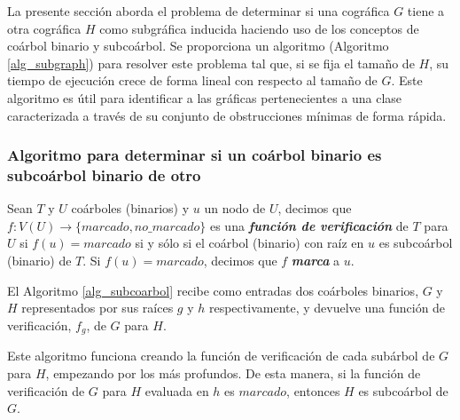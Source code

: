 La presente sección aborda el problema de determinar si una cográfica $G$ tiene a otra cográfica $H$ como subgráfica inducida haciendo uso de los conceptos de coárbol binario y subcoárbol. Se proporciona un algoritmo (Algoritmo \ref{alg_subgraph}) para resolver este problema tal que, si se fija el tamaño de $H$, su tiempo de ejecución crece de forma lineal con respecto al tamaño de $G$. Este algoritmo es útil para identificar a las gráficas pertenecientes a una clase caracterizada a través de su conjunto de obstrucciones mínimas de forma rápida. 

\subsubsection{Algoritmo para determinar si un coárbol binario es subcoárbol binario de otro}

\begin{definition}
    Sean $T$ y $U$ coárboles (binarios) y $u$ un nodo de $U$, decimos que $f:V(U)\rightarrow\{marcado, no\_marcado\}$ es una \textbf{\emph{función de verificación}} de $T$ para $U$ si $f(u) = marcado$ si y sólo si el coárbol (binario) con raíz en $u$ es subcoárbol (binario) de $T$. Si $f(u) = marcado$, decimos que $f$ \textbf{\emph{marca}} a $u$.
\end{definition}

El Algoritmo \ref{alg_subcoarbol} recibe como entradas dos coárboles binarios, $G$ y $H$ representados por sus raíces $g$ y $h$ respectivamente, y devuelve una función de verificación, $f_g$, de $G$ para $H$. 

Este algoritmo funciona creando la función de verificación de cada subárbol de $G$ para $H$, empezando por los más profundos. De esta manera, si la función de verificación de $G$ para $H$ evaluada en $h$ es $marcado$, entonces  $H$ es subcoárbol de $G$.

